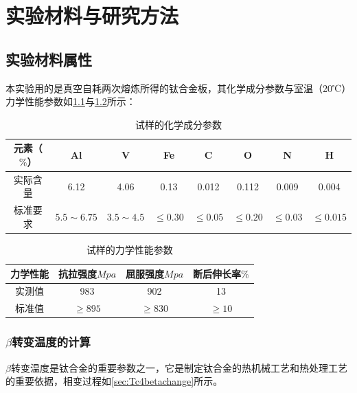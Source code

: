\chapter{实验材料与研究方法}

\section{实验材料属性}
本实验用的是真空自耗两次熔炼所得的钛合金板，其化学成分参数与室温（20℃）力学性能参数如\ref{sec:mytc4chem}与\ref{sec:mytc4machin}所示：
\begin{table}[htbp]
	\centering
	\caption{试样的化学成分参数}
	\label{sec:mytc4chem}
	\begin{tabular}{cccccccc}
		\toprule
		元素（$ \% $） & Al & V &Fe &C& O& N &H \\ \midrule
		实际含量 & 6.12&4.06 &0.13 &0.012&0.112&0.009&0.004  \\
		标准要求 &$ 5.5\sim 6.75 $ & $ 3.5\sim 4.5 $&$ \le 0.30 $ & $ \le 0.05 $&$ \le 0.20 $&$ \le 0.03$ &$ \le 0.015 $ \\ \bottomrule
	\end{tabular}
\end{table}
\begin{table}[htbp]
	\centering
	\caption{试样的力学性能参数}
	\label{sec:mytc4machin}
	\begin{tabular}{cccc}
		\toprule
		力学性能& 抗拉强度$Mpa  $& 屈服强度$ Mpa $&断后伸长率$ \% $\\ \midrule
		实测值 & 983 &902 & 13\\
		标准值 &$ \ge 895 $&$ \ge 830 $&$ \ge 10 $ \\ \bottomrule
	\end{tabular}
\end{table}

%

\subsection{$\beta$转变温度的计算}
$\beta$转变温度是钛合金的重要参数之一，它是制定钛合金的热机械工艺和热处理工艺的重要依据，相变过程如\ref{sec:Tc4betachange}所示。

